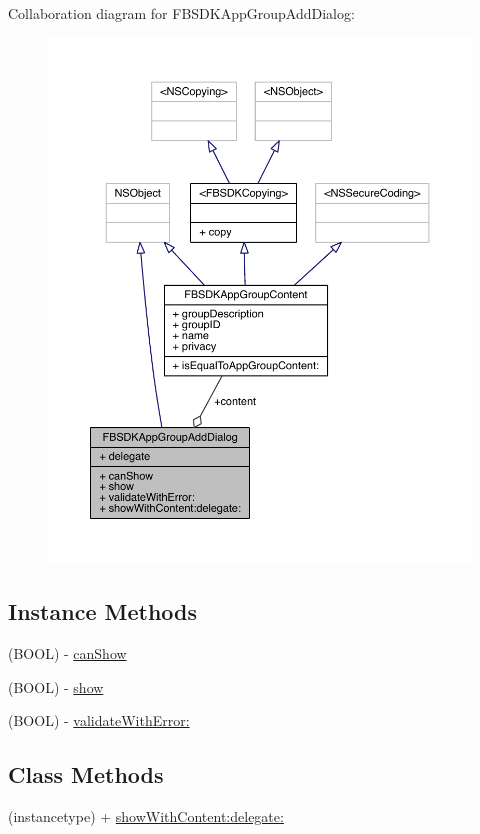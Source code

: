 Collaboration diagram for F\-B\-S\-D\-K\-App\-Group\-Add\-Dialog\-:
\nopagebreak
\begin{figure}[H]
\begin{center}
\leavevmode
\includegraphics[width=350pt]{interface_f_b_s_d_k_app_group_add_dialog__coll__graph}
\end{center}
\end{figure}
\subsection*{Instance Methods}
\begin{DoxyCompactItemize}
\item 
(B\-O\-O\-L) -\/ \hyperlink{interface_f_b_s_d_k_app_group_add_dialog_a845f3b19aec34ac420fac564ec70e6dc}{can\-Show}
\item 
(B\-O\-O\-L) -\/ \hyperlink{interface_f_b_s_d_k_app_group_add_dialog_a0c274c0f03da8de5955022653fe8b42c}{show}
\item 
(B\-O\-O\-L) -\/ \hyperlink{interface_f_b_s_d_k_app_group_add_dialog_a2e868eff528a05e5d4a39bb36d058534}{validate\-With\-Error\-:}
\end{DoxyCompactItemize}
\subsection*{Class Methods}
\begin{DoxyCompactItemize}
\item 
(instancetype) + \hyperlink{interface_f_b_s_d_k_app_group_add_dialog_a832b5f995d7f3d59df7eb225c4e8e898}{show\-With\-Content\-:delegate\-:}
\end{DoxyCompactItemize}
